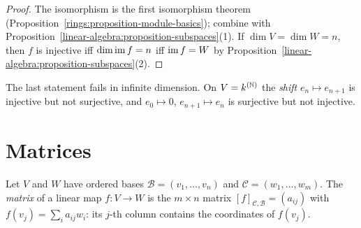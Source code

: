 \begin{proof}
The isomorphism is the first isomorphism theorem
(Proposition~\ref{rings:proposition-module-basics}); combine with
Proposition~\ref{linear-algebra:proposition-subspaces}(1). If $\dim V = \dim W = n$, then $f$ is
injective iff $\dim \operatorname{im} f = n$ iff $\operatorname{im} f = W$ by
Proposition~\ref{linear-algebra:proposition-subspaces}(2).
\end{proof}

\begin{counterexample}\label{linear-algebra:counterexample-shift}
The last statement fails in infinite dimension. On $V = k^{(\mathbb{N})}$ the \emph{shift}
$e_n \mapsto e_{n+1}$ is injective but not surjective, and $e_0 \mapsto 0$, $e_{n+1} \mapsto e_n$ is
surjective but not injective.
\end{counterexample}

\section{Matrices}\label{linear-algebra:section-matrices}

\begin{definition}\label{linear-algebra:definition-matrix}
Let $V$ and $W$ have ordered bases $\mathcal{B} = (v_1, \ldots, v_n)$ and $\mathcal{C} = (w_1, \ldots, w_m)$.
The \emph{matrix} of a linear map $f \colon V \to W$ is the $m \times n$ matrix
$[f]_{\mathcal{C}, \mathcal{B}} = (a_{ij})$ with $f(v_j) = \sum_i a_{ij} w_i$: its $j$-th column contains the
coordinates of $f(v_j)$.
\end{definition}

